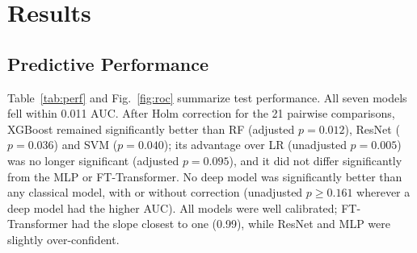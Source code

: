 \documentclass[journal]{IEEEtran}
\begin{document}
\section{Results}

\subsection{Predictive Performance}
Table~\ref{tab:perf} and Fig.~\ref{fig:roc} summarize test performance. All seven models fell within 0.011 AUC. After Holm correction for the 21 pairwise comparisons, XGBoost remained significantly better than RF (adjusted $p = 0.012$), ResNet ($p = 0.036$) and SVM ($p = 0.040$); its advantage over LR (unadjusted $p = 0.005$) was no longer significant (adjusted $p = 0.095$), and it did not differ significantly from the MLP or FT-Transformer. No deep model was significantly better than any classical model, with or without correction (unadjusted $p \geq 0.161$ wherever a deep model had the higher AUC). All models were well calibrated; FT-Transformer had the slope closest to one (0.99), while ResNet and MLP were slightly over-confident.

\begin{table}[t]
\caption{Test-Set Performance ($n = 4{,}311$; 474 CVD Cases)}
\label{tab:perf}
\centering
\setlength{\tabcolsep}{4pt}
\end{table}
\end{document}
